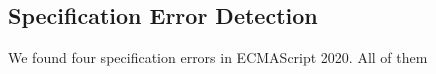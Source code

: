 

\subsection{Specification Error Detection}

We found four specification errors in ECMAScript 2020. All of them 



